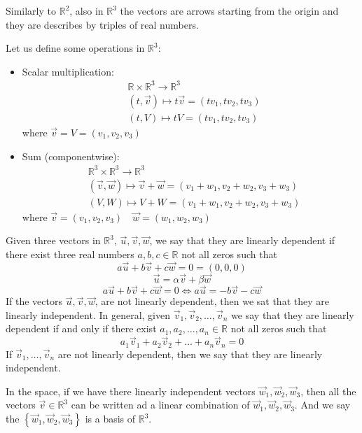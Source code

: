 Similarly to $\mathbb{R}^2$, also in $\mathbb{R}^3$ the vectors are arrows starting from the origin and they are describes by triples of real numbers. 

\begin{remark}
Let us define some operations in $\mathbb{R}^3$:
\begin{itemize}
    \item Scalar multiplication:
    \begin{align*}
    &\mathbb{R} \times \mathbb{R}^3 \longrightarrow \mathbb{R}^3 \\
    &(t, \vec v) \longmapsto t \vec v = (tv_1, tv_2, tv_3)\\
    &(t, V) \longmapsto t V = (tv_1, tv_2, tv_3)
    \end{align*}
    where $\vec v = V = (v_1,v_2,v_3)$
    \item Sum (componentwise):
    \begin{align*}
    &\mathbb{R}^3 \times \mathbb{R}^3 \longrightarrow \mathbb{R}^3\\
    &(\vec v, \vec w) \longmapsto \vec v + \vec w = (v_1+w_1, v_2 + w_2, v_3 + w_3)\\
    &(V, W) \longmapsto V + W = (v_1+w_1, v_2 + w_2, v_3 + w_3)
    \end{align*}
    where $\vec v = (v_1, v_2, v_3) \quad \vec w = (w_1, w_2, w_3)$ 
\end{itemize}
\end{remark}

Given three vectors in $\mathbb{R}^3$, $\vec u, \vec v, \vec w$, we say that they are linearly dependent if there exist three real numbers $a,b,c \in \mathbb{R}$ not all zeros such that
$$a \vec u + b \vec v + c \vec w = 0 = (0,0,0)$$
$$\vec u = \alpha \vec v + \beta \vec w$$
$$a \vec u + b \vec v + c \vec w = 0 \Leftrightarrow a \vec u = - b \vec v - c \vec w$$
If the vectors $\vec u, \vec v, \vec w$, are not linearly dependent, then we sat that they are linearly independent.
In general, given $\vec v_1, \vec v_2, \dots, \vec v_n$ we say that they are linearly dependent if and only if there exist $a_1, a_2, \dots, a_n \in \mathbb{R}$ not all zeros such that
$$a_1 \vec v_1 + a_2 \vec v_2 + \dots + a_n \vec v_n = 0$$
If $\vec v_1, \dots, \vec v_n$ are not linearly dependent, then we say that they are linearly independent. 

In the space, if we have there linearly independent vectors $\vec w_1, \vec w_2, \vec w_3$, then all the vectors $\vec v \in \mathbb{R}^3$ can be written ad a linear combination of $\vec w_1, \vec w_2, \vec w_3$. And we say the $\left\{ \vec w_1, \vec w_2, \vec w_3 \right\}$ is a basis of $\mathbb{R}^3$.

